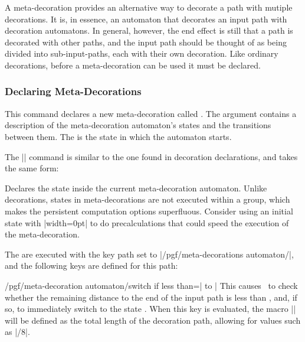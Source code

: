 \label{section-base-meta-decorations}

A meta-decoration provides an alternative way to decorate a path with 
mutiple decorations. It is, in essence, an automaton that decorates
an input path with decoration automatons. In general, however, the end
effect is still that a path is decorated with other paths, and the input 
path should be thought of as being divided into sub-input-paths, each with 
their own decoration. Like ordinary decorations, before a
meta-decoration can be used it must be declared.

\subsubsection{Declaring Meta-Decorations}

\begin{command}{\pgfdeclaremetadecorate{}}

  This command declares a new meta-decoration called . The
   argument contains a description of the meta-decoration
  automaton's states and the transitions between them. The
   is the state in which the automaton starts.
  
  The |\state| command is similar to the one found in 
  decoration declarations, and takes the same form:
  
  \begin{command}{\state{}}
    Declares the state  inside the current meta-decoration
    automaton. Unlike decorations, states in meta-decorations are not
    executed within a group, which makes the persistent computation
    options superfluous. Consider using an initial state with
    |width=0pt| to do precalculations that could speed the execution
    of the meta-decoration. 
    
    The  are executed with the key path set to
    |/pgf/meta-decorations automaton/|, and the following keys are defined for 
    this path: 
    
    \begin{key}{/pgf/meta-decoration automaton/switch if less than=| to |}
      This causes \pgfname\ to check whether the
      remaining distance to the end of the input path is less than
      , and, if so, to immediately switch to the state 
      . When this key is evaluated, the macro 
      |\pgfmetadecoratedpathlength| will be defined as the total length of 
      the decoration path, allowing for values such as
      |\pgfmetadecoratedpathlength/8|.
    \end{key}
    

\end{command}
\end{command}
